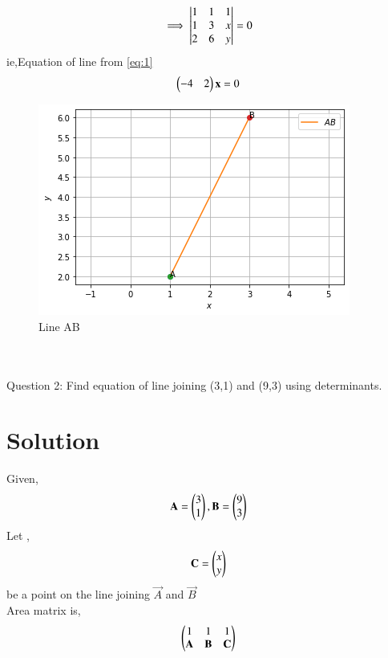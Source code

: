 \documentclass[journal,12pt,twocolumn]{IEEEtran}
\begin{document}
	
\begin{align}
\implies\begin{vmatrix}
	 1 & 1 & 1 \\ 
	 1 & 3 & x \\ 
	 2 & 6 & y\end{vmatrix}=0 \label{eq:1}
\end{align}
ie,Equation of line from \eqref{eq:1}
\begin{align}
	    \begin{pmatrix}-4 & 2\end{pmatrix}\mathbf{x}=0
\end{align}
\begin{figure}[!h]
\centering
\includegraphics[width=\columnwidth]{fig5.png}
\caption{Line AB}
\end{figure}
\\
\\
	
Question 2:
Find equation of line joining (3,1) and
(9,3) using determinants.
\section{Solution}
Given, 
	\begin{align}
	 \mathbf{A} = \begin{pmatrix}3\\1\end{pmatrix} , \mathbf{B} = \begin{pmatrix}9 \\ 3\end{pmatrix}
	\end{align}
	Let ,
	\begin{align}
	\mathbf{C} = \begin{pmatrix}x\\y\end{pmatrix}
	\end{align}
	be a point on the line joining $\vec{A}$ and $\vec{B}$\\
	Area matrix is,
	\begin{align}
	 \begin{pmatrix}1 & 1& 1 \\
	 \mathbf{A}&\mathbf{B}&\mathbf{C}\end{pmatrix}
	\end{align}
\end{document}
